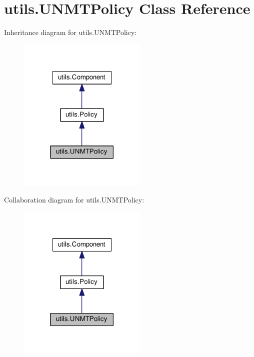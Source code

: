 \hypertarget{classutils_1_1UNMTPolicy}{}\section{utils.\+U\+N\+M\+T\+Policy Class Reference}
\label{classutils_1_1UNMTPolicy}


Inheritance diagram for utils.\+U\+N\+M\+T\+Policy\+:
\nopagebreak
\begin{figure}[H]
\begin{center}
\leavevmode
\includegraphics[width=174pt]{classutils_1_1UNMTPolicy__inherit__graph}
\end{center}
\end{figure}


Collaboration diagram for utils.\+U\+N\+M\+T\+Policy\+:
\nopagebreak
\begin{figure}[H]
\begin{center}
\leavevmode
\includegraphics[width=174pt]{classutils_1_1UNMTPolicy__coll__graph}
\end{center}
\end{figure}
